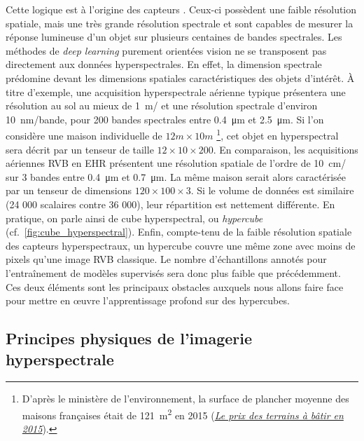 Cette logique est à l'origine des capteurs . Ceux-ci possèdent une faible résolution spatiale, mais une très grande résolution spectrale et sont capables de mesurer la réponse lumineuse d'un objet sur plusieurs centaines de bandes spectrales. Les méthodes de \emph{deep learning} purement orientées vision ne se transposent pas directement aux données hyperspectrales. En effet, la dimension spectrale prédomine devant les dimensions spatiales caractéristiques des objets d'intérêt. À titre d'exemple, une acquisition hyperspectrale aérienne typique présentera une résolution au sol au mieux de \SI{1}{\meter/\px} et une résolution spectrale d'environ \SI{10}{\nano\meter/bande}, pour 200 bandes spectrales entre \SI{0,4}{\micro\meter} et \SI{2,5}{\micro\meter}. Si l'on considère une maison individuelle de $12m\times10m$ \footnote{D'après le ministère de l'environnement, la surface de plancher moyenne des maisons françaises était de \SI{121}{\meter\squared} en 2015 (\href{http://www.cohesion-territoires.gouv.fr/IMG/pdf/datalab-essentiel-51-le-prix-des-terrains-a-batir-en-2015-oct2016.pdf}{\og \emph{Le prix des terrains à bâtir en 2015\fg}}).}, cet objet en hyperspectral sera décrit par un tenseur de taille $12\times10\times200$.
En comparaison, les acquisitions aériennes \gls{RVB} en \gls{EHR} présentent une résolution spatiale de l'ordre de \SI{10}{\centi\meter/\px} sur 3 bandes entre \SI{0,4}{\micro\meter} et \SI{0,7}{\micro\meter}. La même maison serait alors caractérisée par un tenseur de dimensions $120\times100\times3$. Si le volume de données est similaire (24 000 scalaires contre 36 000), leur répartition est nettement différente. En pratique, on parle ainsi de cube hyperspectral, ou \emph{hypercube} (cf.~\cref{fig:cube_hyperspectral}). Enfin, compte-tenu de la faible résolution spatiale des capteurs hyperspectraux, un hypercube couvre une même zone avec moins de pixels qu'une image \gls{RVB} classique. Le nombre d'échantillons annotés pour l'entraînement de modèles supervisés sera donc plus faible que précédemment. Ces deux éléments sont les principaux obstacles auxquels nous allons faire face pour mettre en \oe{}uvre l'apprentissage profond sur des hypercubes.

\subsection{Principes physiques de l'imagerie hyperspectrale}

